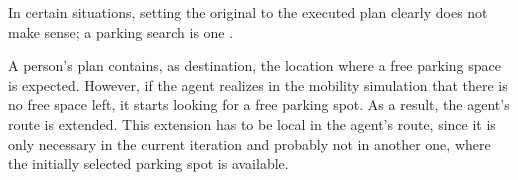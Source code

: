 In certain situations, setting the original to the executed plan clearly does not make sense; a parking search is one \citep[][]{WaraichEtAl_unpub_TRB_2013, Waraich_unpub_IATBR_2012}. %

%
A person's plan contains, as destination, the location where a free parking space is expected. However, if the agent realizes in the mobility simulation that there is no free space left, it starts looking for a free parking spot. As a result, the agent's route is extended. This extension has to be local in the agent's route, since it is only necessary in the current iteration
and probably not in another one, where the initially selected parking spot is available.



